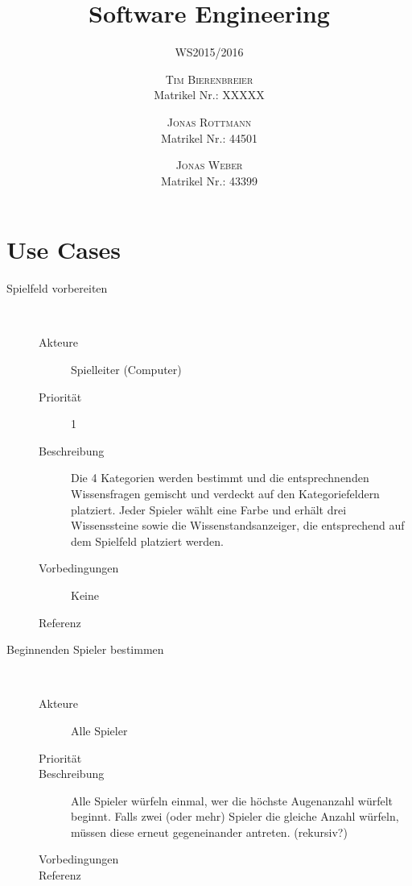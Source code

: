 \documentclass{scrartcl} %
\title{Software Engineering}
\subtitle{WS2015/2016} %
\author{
	\textsc{Tim Bierenbreier}\\
	\normalsize Matrikel Nr.: XXXXX
	\and
	\textsc{Jonas Rottmann}\\
	\normalsize Matrikel Nr.: 44501
	\and
	\textsc{Jonas Weber}\\
	\normalsize Matrikel Nr.: 43399
}
\begin{document}
\maketitle
\section{Use Cases}

\begin{description}
   \item[Spielfeld vorbereiten]~\par
   \begin{description}
      \item[Akteure] Spielleiter (Computer)
      \item[Priorität]  1
      \item[Beschreibung] Die 4 Kategorien werden bestimmt und die entsprechnenden Wissensfragen gemischt und verdeckt auf den Kategoriefeldern platziert. Jeder Spieler wählt eine Farbe und erhält drei Wissenssteine sowie die Wissenstandsanzeiger, die entsprechend auf dem Spielfeld platziert werden.
      \item[Vorbedingungen] Keine
      \item[Referenz] 
   \end{description}
\end{description}
\begin{description}
   \item[Beginnenden Spieler bestimmen]~\par
   \begin{description}
      \item[Akteure] Alle Spieler
      \item[Priorität]  
      \item[Beschreibung] Alle Spieler würfeln einmal, wer die höchste Augenanzahl würfelt beginnt. Falls zwei (oder mehr) Spieler die gleiche Anzahl würfeln, müssen diese erneut gegeneinander antreten. (rekursiv?)
      \item[Vorbedingungen] 
      \item[Referenz] 
   \end{description}
\end{description}
\end{document}
